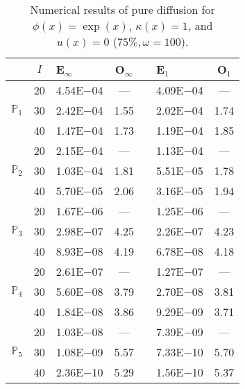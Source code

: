 \begin{table}[H]
\centering
\caption{Numerical results of pure diffusion for $\phi(x)=\exp(x)$, $\kappa(x)=1$, and $u(x)=0$ ($75\%,\omega=100$).}
\begin{tabular}{@{}l c l c c l c@{}}
\toprule
 & $I$ & E$_{\infty}$ & O$_{\infty}$ && E$_1$ & O$_1$\\
\midrule
\multirow{3}{*}{$\mathbb{P}_{1}$}
 & 20 & 4.54E$-$04 & --- && 4.09E$-$04 & ---\\
 & 30 & 2.42E$-$04 & 1.55 && 2.02E$-$04 & 1.74\\
 & 40 & 1.47E$-$04 & 1.73 && 1.19E$-$04 & 1.85\\
\midrule
\multirow{3}{*}{$\mathbb{P}_{2}$}
 & 20 & 2.15E$-$04 & --- && 1.13E$-$04 & ---\\
 & 30 & 1.03E$-$04 & 1.81 && 5.51E$-$05 & 1.78\\
 & 40 & 5.70E$-$05 & 2.06 && 3.16E$-$05 & 1.94\\
\midrule
\multirow{3}{*}{$\mathbb{P}_{3}$}
 & 20 & 1.67E$-$06 & --- && 1.25E$-$06 & ---\\
 & 30 & 2.98E$-$07 & 4.25 && 2.26E$-$07 & 4.23\\
 & 40 & 8.93E$-$08 & 4.19 && 6.78E$-$08 & 4.18\\
\midrule
\multirow{3}{*}{$\mathbb{P}_{4}$}
 & 20 & 2.61E$-$07 & --- && 1.27E$-$07 & ---\\
 & 30 & 5.60E$-$08 & 3.79 && 2.70E$-$08 & 3.81\\
 & 40 & 1.84E$-$08 & 3.86 && 9.29E$-$09 & 3.71\\
\midrule
\multirow{3}{*}{$\mathbb{P}_{5}$}
 & 20 & 1.03E$-$08 & --- && 7.39E$-$09 & ---\\
 & 30 & 1.08E$-$09 & 5.57 && 7.33E$-$10 & 5.70\\
 & 40 & 2.36E$-$10 & 5.29 && 1.56E$-$10 & 5.37\\
\bottomrule
\end{tabular}
\end{table}